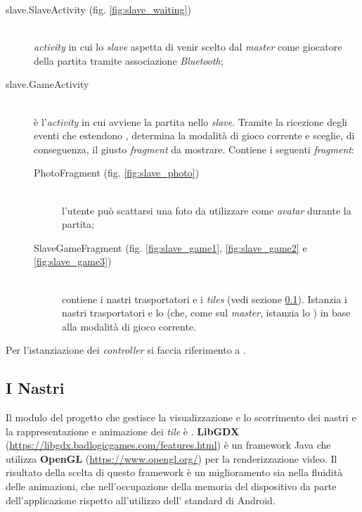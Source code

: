 \begin{description}

\item[slave.SlaveActivity (fig. \ref{fig:slave_waiting})]\hfill\\
    \textit{activity} in cui lo \textit{slave} aspetta di venir scelto dal \textit{master} come giocatore della partita tramite associazione \textit{Bluetooth};


\item[slave.GameActivity]\hfill\\
    è l'\textit{activity} in cui avviene la partita nello \textit{slave}. Tramite la ricezione degli eventi che estendono , determina la modalità di gioco corrente e sceglie, di conseguenza, il giusto \textit{fragment} da mostrare. Contiene i seguenti \textit{fragment}:

    \begin{description}
    \item[PhotoFragment (fig. \ref{fig:slave_photo})]\hfill\\
        l'utente può scattarsi una foto da utilizzare come \textit{avatar} durante la partita;


    \item[SlaveGameFragment (fig. \ref{fig:slave_game1}, \ref{fig:slave_game2} e \ref{fig:slave_game3})]\hfill\\
        contiene i nastri trasportatori e i \textit{tiles} (vedi sezione \ref{subsec:libgdx}). Istanzia i nastri trasportatori e lo  (che, come sul \textit{master}, istanzia lo ) in base alla modalità di gioco corrente.

    \end{description}
\end{description}

Per l'istanziazione dei \textit{controller} si faccia riferimento a .

\subsection{I Nastri}
\label{subsec:libgdx}
Il modulo del progetto che gestisce la visualizzazione e lo scorrimento dei nastri e la rappresentazione e animazione dei \textit{tile} è . \textbf{LibGDX} (\url{https://libgdx.badlogicgames.com/features.html}) è un framework Java che utilizza \textbf{OpenGL} (\url{https://www.opengl.org/}) per la renderizzazione video. Il risultato della scelta di questo framework è un miglioramento sia nella fluidità delle animazioni, che nell'occupazione della memoria del dispositivo da parte dell'applicazione rispetto all'utilizzo dell' standard di Android.

